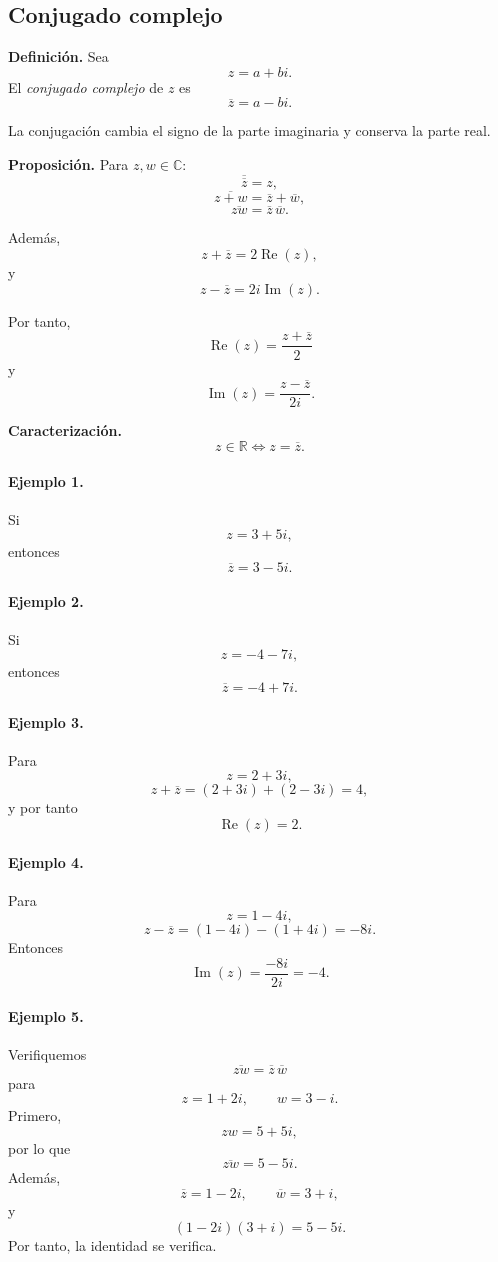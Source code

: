 \subsection{Conjugado complejo}

\textbf{Definición.}
Sea
\[
z=a+bi.
\]
El \emph{conjugado complejo} de $z$ es
\[
\boxed{\overline z=a-bi.}
\]

La conjugación cambia el signo de la parte imaginaria y conserva la parte real.

\textbf{Proposición.}
Para $z,w\in\mathbb{C}$:
\[
\boxed{\overline{\overline z}=z,}
\]
\[
\boxed{\overline{z+w}=\overline z+\overline w,}
\]
\[
\boxed{\overline{zw}=\overline z\,\overline w.}
\]

Además,
\[
z+\overline z=2\operatorname{Re}(z),
\]
y
\[
z-\overline z=2i\operatorname{Im}(z).
\]

Por tanto,
\[
\boxed{
\operatorname{Re}(z)
=
\frac{z+\overline z}{2}
}
\]
y
\[
\boxed{
\operatorname{Im}(z)
=
\frac{z-\overline z}{2i}.
}
\]

\textbf{Caracterización.}
\[
z\in\mathbb{R}
\iff
z=\overline z.
\]

\paragraph{Ejemplo 1.}
Si
\[
z=3+5i,
\]
entonces
\[
\overline z=3-5i.
\]

\paragraph{Ejemplo 2.}
Si
\[
z=-4-7i,
\]
entonces
\[
\overline z=-4+7i.
\]

\paragraph{Ejemplo 3.}
Para
\[
z=2+3i,
\]
\[
z+\overline z
=
(2+3i)+(2-3i)
=
4,
\]
y por tanto
\[
\operatorname{Re}(z)=2.
\]

\paragraph{Ejemplo 4.}
Para
\[
z=1-4i,
\]
\[
z-\overline z
=
(1-4i)-(1+4i)
=
-8i.
\]
Entonces
\[
\operatorname{Im}(z)
=
\frac{-8i}{2i}
=
-4.
\]

\paragraph{Ejemplo 5.}
Verifiquemos
\[
\overline{zw}=\overline z\,\overline w
\]
para
\[
z=1+2i,
\qquad
w=3-i.
\]
Primero,
\[
zw=5+5i,
\]
por lo que
\[
\overline{zw}=5-5i.
\]
Además,
\[
\overline z=1-2i,
\qquad
\overline w=3+i,
\]
y
\[
(1-2i)(3+i)=5-5i.
\]
Por tanto, la identidad se verifica.

